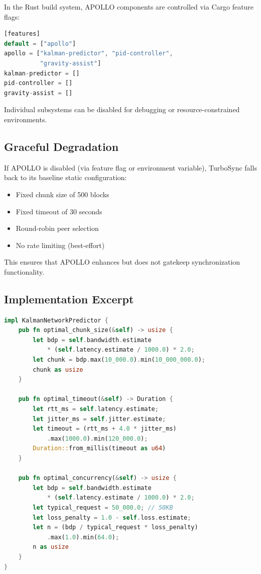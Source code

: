 \documentclass[11pt,a4paper]{article}
\begin{document}
In the Rust build system, APOLLO components are controlled via Cargo feature flags:

\begin{lstlisting}[language=Rust,caption={Cargo.toml feature configuration}]
[features]
default = ["apollo"]
apollo = ["kalman-predictor", "pid-controller",
          "gravity-assist"]
kalman-predictor = []
pid-controller = []
gravity-assist = []
\end{lstlisting}

Individual subsystems can be disabled for debugging or resource-constrained environments.

\subsection{Graceful Degradation}

If APOLLO is disabled (via feature flag or environment variable), TurboSync falls back to its baseline static configuration:

\begin{itemize}
    \item Fixed chunk size of 500 blocks
    \item Fixed timeout of 30 seconds
    \item Round-robin peer selection
    \item No rate limiting (best-effort)
\end{itemize}

This ensures that APOLLO enhances but does not gatekeep synchronization functionality.

\subsection{Implementation Excerpt}

\begin{lstlisting}[language=Rust,caption={Kalman-driven sync parameter computation}]
impl KalmanNetworkPredictor {
    pub fn optimal_chunk_size(&self) -> usize {
        let bdp = self.bandwidth.estimate
            * (self.latency.estimate / 1000.0) * 2.0;
        let chunk = bdp.max(10_000.0).min(10_000_000.0);
        chunk as usize
    }

    pub fn optimal_timeout(&self) -> Duration {
        let rtt_ms = self.latency.estimate;
        let jitter_ms = self.jitter.estimate;
        let timeout = (rtt_ms + 4.0 * jitter_ms)
            .max(1000.0).min(120_000.0);
        Duration::from_millis(timeout as u64)
    }

    pub fn optimal_concurrency(&self) -> usize {
        let bdp = self.bandwidth.estimate
            * (self.latency.estimate / 1000.0) * 2.0;
        let typical_request = 50_000.0; // 50KB
        let loss_penalty = 1.0 - self.loss.estimate;
        let n = (bdp / typical_request * loss_penalty)
            .max(1.0).min(64.0);
        n as usize
    }
}
\end{lstlisting}
\end{document}
